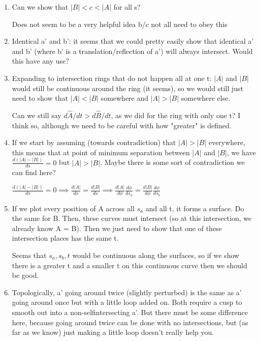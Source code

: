 \documentclass[12pt]{article}
\begin{document}
\begin{enumerate}
\item Can we show that $|B| < c < |A|$ for all s?

Does not seem to be a very helpful idea b/c not all need to obey this

\item Identical a' and b': it seems that we could pretty easily show that identical a' and b' (where b' is a translation/reflection of a') will always intersect. Would this have any use?

\item Expanding to intersection rings that do not happen all at one t: $|A|$ and $|B|$ would still be continuous around the ring (it seems), so we would still just need to show that $|A| < |B|$ somewhere and $|A| > |B|$ somewhere else.

Can we still say $d\hat{A}/dt > d\hat{B}/dt$, as we did for the ring with only one t? I think so, although we need to be careful with how "greater" is defined.

\item If we start by assuming (towards contradiction) that $|A| > |B|$ everywhere, this means that at point of minimum separation between $|A|$ and $|B|$, we have $\frac{d(|A| -|B|)}{ds} = 0$ but $|A| > |B|$. Maybe there is some sort of contradiction we can find here?

$\frac{d(|A| -|B|)}{ds} = 0 \implies \frac{d|A|}{ds}=\frac{d|B|}{ds} \implies \frac{d|A|}{d\phi} \frac{d\phi}{d s_a} = \frac{d|B|}{d\phi} \frac{d\phi}{d s_b}$

\item If we plot every position of A across all $s_a$ and all t, it forms a surface. Do the same for B. Then, these curves must intersect (so at this intersection, we already know A = B). Then we just need to show that one of these intersection places has the same t.

Seems that $s_a, s_b, t$ would be continuous along the surfaces, so if we show there is a greater t and a smaller t on this continuous curve then we should be good.

\item Topologically, a' going around twice (slightly perturbed) is the same as a' going around once but with a little loop added on. Both require a cusp to smooth out into a non-selfintersecting a'. But there must be some difference here, because going around twice can be done with no intersections, but (as far as we know) just making a little loop doesn't really help you.


\end{enumerate}
\end{document}
